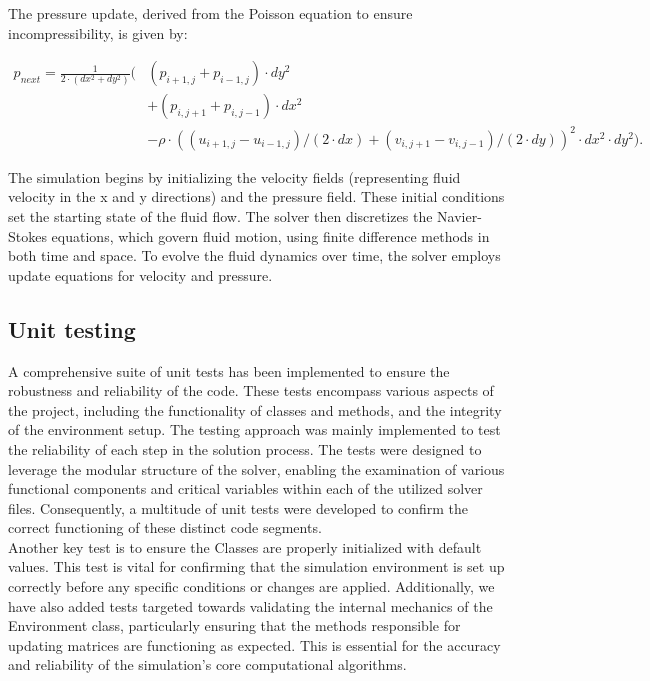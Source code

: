 The pressure update, derived from the Poisson equation to ensure incompressibility, is given by:

\begin{equation}
\begin{split}
    p_{next} = \frac{1}{2 \cdot (dx^2 + dy^2)} \bigg(& (p_{i+1, j} + p_{i-1, j}) \cdot dy^2 \\
    & + (p_{i, j+1} + p_{i, j-1}) \cdot dx^2 \\
    & - \rho \cdot \left((u_{i+1, j} - u_{i-1, j}) / (2 \cdot dx) + (v_{i, j+1} - v_{i, j-1}) / (2 \cdot dy)\right)^2 \cdot dx^2 \cdot dy^2 \bigg).
\end{split}
\end{equation}

The simulation begins by initializing the velocity fields (representing fluid velocity in the x and y directions) and the pressure field. These initial conditions set the starting state of the fluid flow. The solver then discretizes the Navier-Stokes equations, which govern fluid motion, using finite difference methods in both time and space. To evolve the fluid dynamics over time, the solver employs update equations for velocity and pressure. 

\subsection{Unit testing}
A comprehensive suite of unit tests has been implemented to ensure the robustness and reliability of the code. These tests encompass various aspects of the project, including the functionality of classes and methods, and the integrity of the environment setup. The testing approach was mainly implemented to test the reliability of each step in the solution process. The tests were designed to leverage the modular structure of the solver, enabling the examination of various functional components and critical variables within each of the utilized solver files. Consequently, a multitude of unit tests were developed to confirm the correct functioning of these distinct code segments.
\\

Another key test is to ensure the Classes are properly initialized with default values. This test is vital for confirming that the simulation environment is set up correctly before any specific conditions or changes are applied. Additionally, we have also added tests targeted towards validating the internal mechanics of the Environment class, particularly ensuring that the methods responsible for updating matrices are functioning as expected. This is essential for the accuracy and reliability of the simulation's core computational algorithms. 
\\

